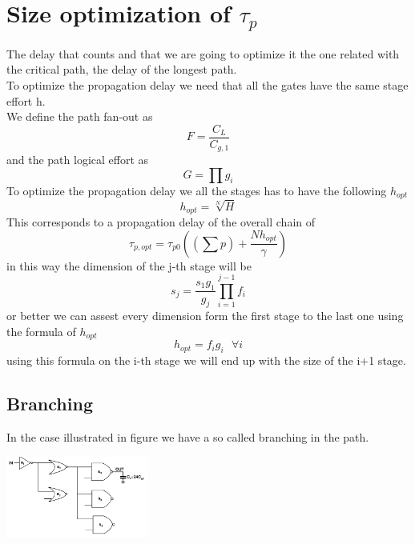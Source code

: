 \section{Size optimization of $\tau_p$}
The delay that counts and that we are going to optimize it the one related with the critical path, the delay of the longest path.\\
To optimize the propagation delay we need that all the gates have the same stage effort h.\\
\vspace{5mm}
We define the path fan-out as 
\begin{equation}
F=\frac{C_L}{C_{g,1}}
\end{equation}
and the path logical effort as 
\begin{equation}
G=\prod g_i
\end{equation}
To optimize the propagation delay we all the stages has to have the following $h_{opt}$
\begin{equation}
h_{opt}=\sqrt[N]{H}
\end{equation}
This corresponds to a propagation delay of the overall chain of 
\begin{equation}
\tau_{p,opt}=\tau_{p0}\left( (\sum p)+\frac{N h_{opt}}{\gamma} \right)
\end{equation}
in this way the dimension of the j-th stage will be 
\begin{equation}
s_j=\frac{s_1g_1}{g_j}\prod_{i=1}^{j-1}f_i
\end{equation}
or better we can assest every dimension form the first stage to the last one using the formula of $h_{opt}$
\begin{equation}
h_{opt}=f_ig_i \ \ \ \forall i
\end{equation}
using this formula on the i-th stage we will end up with the size of the i+1 stage.

\subsection{Branching}
In the case illustrated in figure we have a so called branching in the path.

\centering
\includegraphics[width=0.35\textwidth]{C6_6.png}\\
\raggedright

